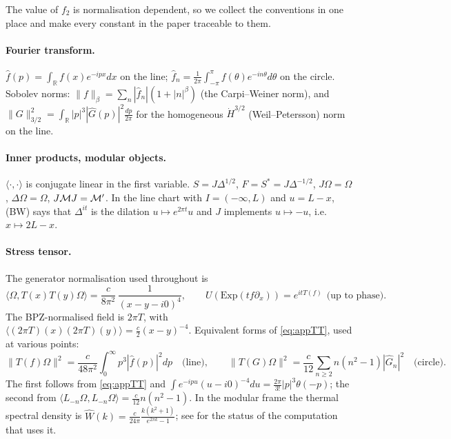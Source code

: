 The value of $f_{2}$ is normalisation dependent, so we collect the conventions in one place and make every
constant in the paper traceable to them.

\paragraph{Fourier transform.}  $\hat f(p)=\int_{\mathbb R}f(x)e^{-ipx}dx$ on the line;
$\hat f_{n}=\frac{1}{2\pi}\int_{-\pi}^{\pi}f(\theta)e^{-in\theta}d\theta$ on the circle.  Sobolev norms:
$\|f\|_{\beta}=\sum_{n}|\hat f_{n}|(1+|n|^{\beta})$ (the Carpi--Weiner norm), and
$\|G\|_{3/2}^{2}=\int_{\mathbb R}|p|^{3}|\hat G(p)|^{2}\frac{dp}{2\pi}$ for the homogeneous
$\dot H^{3/2}$ (Weil--Petersson) norm on the line.

\paragraph{Inner products, modular objects.}  $\langle\cdot,\cdot\rangle$ is conjugate linear in the first
variable.  $S=J\Delta^{1/2}$, $F=S^{*}=J\Delta^{-1/2}$, $J\Omega=\Omega$, $\Delta\Omega=\Omega$,
$J\mathcal M J=\mathcal M'$.  In the line chart with $I=(-\infty,L)$ and $u=L-x$, (BW) says that $\Delta^{it}$ is the
dilation $u\mapsto e^{2\pi t}u$ and $J$ implements $u\mapsto-u$, i.e.\ $x\mapsto 2L-x$.

\paragraph{Stress tensor.}  The generator normalisation used throughout is
\begin{equation}\label{eq:appTT}
 \langle\Omega,T(x)T(y)\Omega\rangle=\frac{c}{8\pi^{2}}\,\frac{1}{(x-y-i0)^{4}},
 \qquad U(\mathrm{Exp}(tf\partial_{x}))=e^{itT(f)}\ \ \text{(up to phase)} .
\end{equation}
The BPZ-normalised field is $2\pi T$, with $\langle(2\pi T)(x)(2\pi T)(y)\rangle=\frac{c}{2}(x-y)^{-4}$.
Equivalent forms of \eqref{eq:appTT}, used at various points:
\begin{equation}\label{eq:appnorm}
 \|T(f)\Omega\|^{2}=\frac{c}{48\pi^{2}}\int_{0}^{\infty}p^{3}|\hat f(p)|^{2}dp
 \quad\text{(line)},\qquad
 \|T(G)\Omega\|^{2}=\frac{c}{12}\sum_{n\ge2}n(n^{2}-1)|\hat G_{n}|^{2}
 \quad\text{(circle)} .
\end{equation}
The first follows from \eqref{eq:appTT} and
$\int e^{-ipu}(u-i0)^{-4}du=\frac{2\pi}{3!}|p|^{3}\theta(-p)$; the second from
$\langle L_{-n}\Omega,L_{-n}\Omega\rangle=\frac{c}{12}n(n^{2}-1)$.  In the modular frame the thermal
spectral density is $\widehat W(k)=\frac{c}{24\pi}\frac{k(k^{2}+1)}{e^{2\pi k}-1}$; see 
for the status of the computation that uses it.


